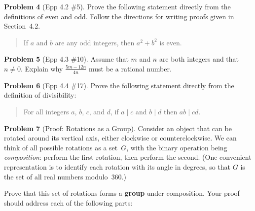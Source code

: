 \documentclass[11pt]{article}
\begin{document}
\bigskip

\noindent\textbf{Problem 4} (Epp 4.2 \#5). \;
Prove the following statement directly from the definitions of
even and odd.  Follow the directions for writing proofs given in
Section~4.2.

\begin{quote}
  If $a$ and $b$ are any odd integers, then $a^2 + b^2$ is even.
\end{quote}

\bigskip

\noindent\textbf{Problem 5} (Epp 4.3 \#10). \;
Assume that $m$ and $n$ are both integers and that $n \ne 0$.
Explain why $\displaystyle\frac{5m - 12n}{4n}$ must be a
rational number.

\bigskip

\noindent\textbf{Problem 6} (Epp 4.4 \#17). \;
Prove the following statement directly from the definition of
divisibility:

\begin{quote}
  For all integers $a$, $b$, $c$, and $d$, if $a \mid c$ and
  $b \mid d$ then $ab \mid cd$.
\end{quote}

\bigskip

\noindent\textbf{Problem 7} (Proof: Rotations as a Group). \;
Consider an object that can be rotated around its vertical axis,
either clockwise or counterclockwise.  We can think of all
possible rotations as a set~$G$, with the binary operation being
\emph{composition}: perform the first rotation, then perform the
second.  (One convenient representation is to identify each
rotation with its angle in degrees, so that $G$ is the set of all
real numbers modulo~$360$.)

Prove that this set of rotations forms a \textbf{group} under
composition.  Your proof should address each of the following
parts:
\end{document}
